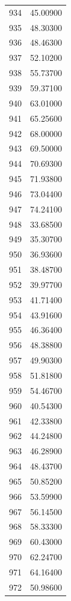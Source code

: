\documentclass[
  letterpaper,
  DIV=11,
  numbers=noendperiod]{scrreprt}
\begin{document}
\begin{tcolorbox}
\begin{tabular}{lr}
934  &         45.00900 \\
935  &         48.30300 \\
936  &         48.46300 \\
937  &         52.10200 \\
938  &         55.73700 \\
939  &         59.37100 \\
940  &         63.01000 \\
941  &         65.25600 \\
942  &         68.00000 \\
943  &         69.50000 \\
944  &         70.69300 \\
945  &         71.93800 \\
946  &         73.04400 \\
947  &         74.24100 \\
948  &         33.68500 \\
949  &         35.30700 \\
950  &         36.93600 \\
951  &         38.48700 \\
952  &         39.97700 \\
953  &         41.71400 \\
954  &         43.91600 \\
955  &         46.36400 \\
956  &         48.38800 \\
957  &         49.90300 \\
958  &         51.81800 \\
959  &         54.46700 \\
960  &         40.54300 \\
961  &         42.33800 \\
962  &         44.24800 \\
963  &         46.28900 \\
964  &         48.43700 \\
965  &         50.85200 \\
966  &         53.59900 \\
967  &         56.14500 \\
968  &         58.33300 \\
969  &         60.43000 \\
970  &         62.24700 \\
971  &         64.16400 \\
972  &         50.98600 \\

\end{tabular}
\end{tcolorbox}
\end{document}
